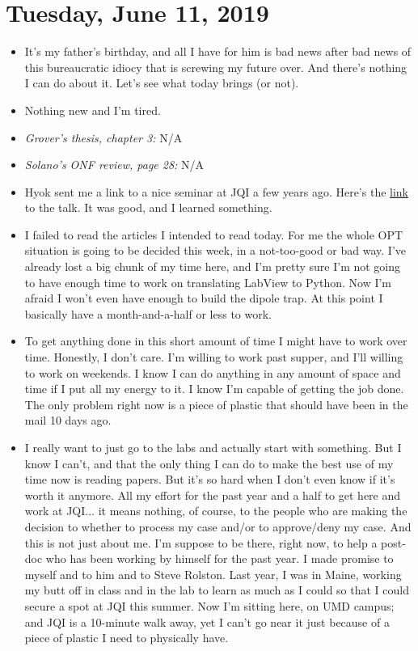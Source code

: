 \documentclass{report}
\theoremstyle{definition}
\begin{document}
\section{Tuesday, June 11, 2019}

\begin{itemize}
	\item It's my father's birthday, and all I have for him is bad news after bad news of this bureaucratic idiocy that is screwing my future over. And there's nothing I can do about it. Let's see what today brings (or not).
	
	\item Nothing new and I'm tired. 
	
	
	\item \textit{Grover's thesis, chapter 3:} N/A
	
	
	\item \textit{Solano's ONF review, page 28:} N/A
	
	\item Hyok sent me a link to a nice seminar at JQI a few years ago. Here's the \href{https://www.youtube.com/watch?v=IFsB554TCZY}{link} to the talk. It was good, and I learned something.
	
	\item I failed to read the articles I intended to read today. For me the whole OPT situation is going to be decided this week, in a not-too-good or bad way. I've already lost a big chunk of my time here, and I'm pretty sure I'm not going to have enough time to work on translating LabView to Python. Now I'm afraid I won't even have enough to build the dipole trap. At this point I basically have a month-and-a-half or less to work. 
	
	\item To get anything done in this short amount of time I might have to work over time. Honestly, I don't care. I'm willing to work past supper, and I'll willing to work on weekends. I know I can do anything in any amount of space and time if I put all my energy to it. I know I'm capable of getting the job done. The only problem right now is a piece of plastic that should have been in the mail 10 days ago.
	
	\item I really want to just go to the labs and actually start with something. But I know I can't, and that the only thing I can do to make the best use of my time now is reading papers. But it's so hard when I don't even know if it's worth it anymore. All my effort for the past year and a half to get here and work at JQI... it means nothing, of course, to the people who are making the decision to whether to process my case and/or to approve/deny my case. And this is not just about me. I'm suppose to be there, right now, to help a post-doc who has been working by himself for the past year. I made promise to myself and to him and to Steve Rolston. Last year, I was in Maine, working my butt off in class and in the lab to learn as much as I could so that I could secure a spot at JQI this summer. Now I'm sitting here, on UMD campus; and JQI is a 10-minute walk away, yet I can't go near it just because of a piece of plastic I need to physically have. 
	

\end{itemize}
\end{document}
